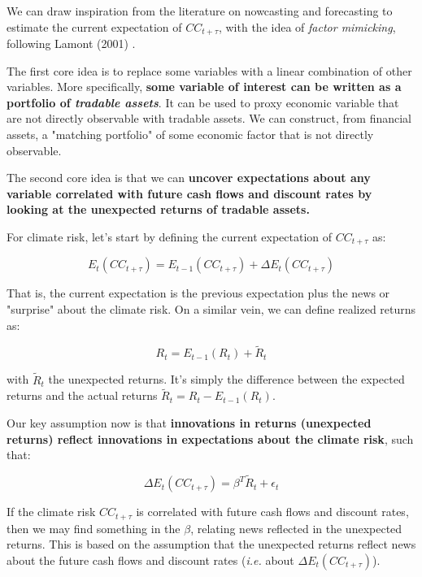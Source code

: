 We can draw inspiration from the literature
on nowcasting and forecasting to estimate
the current expectation of $CC_{t+\tau}$, 
with the idea of \textit{factor mimicking}, 
following Lamont (2001) \cite{lamont2001economic}.

The first core idea is to replace some variables with 
a linear combination of other variables. More
specifically, \textbf{some variable of interest can be
written as a portfolio of \textit{tradable assets}}.
It can be used to proxy economic 
variable that 
are not directly observable with tradable assets.
We can construct, from financial assets, 
a "matching portfolio" of some economic factor
that is not directly observable.

The second core idea is that 
we can \textbf{uncover expectations about any variable
correlated with future cash flows and discount rates
by looking at the unexpected returns of tradable assets.}

For climate risk, let's start by defining the current expectation
of $CC_{t+\tau}$ as:

\begin{equation}
    E_{t}(CC_{t+\tau}) = E_{t-1}(CC_{t+\tau}) + \Delta E_{t}(CC_{t+\tau})
\end{equation}

That is, the current expectation is the previous
expectation plus the news or "surprise" about the climate risk.
On a similar vein, we can define realized returns as:

\begin{equation}
    R_{t} = E_{t-1}(R_{t}) + \tilde{R}_{t}
\end{equation}

with $\tilde{R}_{t}$ the unexpected returns.
It's simply the difference between the 
expected returns and the actual returns
$\tilde{R}_{t} = R_{t} - E_{t-1}(R_{t})$.

Our key assumption now is that \textbf{innovations 
in returns (unexpected returns) reflect innovations
in expectations about the climate risk}, such that:

\begin{equation}
    \Delta E_{t}(CC_{t+\tau}) = \beta^T \tilde{R}_{t} + \epsilon_{t}
\end{equation}

If the climate risk $CC_{t+\tau}$ is correlated
with future cash flows and discount rates,
then we may find something in the $\beta$, relating
news reflected in the unexpected returns.
This is based on the assumption that the unexpected
returns reflect news about the future cash flows
and discount rates (\textit{i.e.} about
$\Delta E_{t}(CC_{t+\tau})$).

